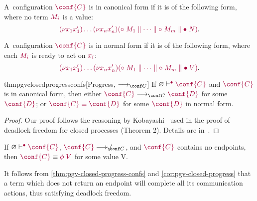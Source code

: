 \documentclass[main.tex]{subfiles}
\begin{document}
\begin{compacttheorems}
  \begin{definition}
    \label{def:pgv-canonical-forms}
    A~configuration $\tm{\conf{C}}$ is in canonical form if it is of the following form, where no term $\tm{M_i}$ is a value:
    \[
      \tm{\res{x_1}{x'_1}{\dots\res{x_n}{x'_n}{(\child\;M_1\parallel\dots\parallel\child\;M_m\parallel\main\;N)}}}.
    \]
  \end{definition}
  \begin{definition}
    A~configuration $\tm{\conf{C}}$ is in normal form if it is of the following form, where each $\tm{M_i}$ is ready to act on $\tm{x_i}$:
    \[
      \tm{\res{x_1}{x'_1}{\dots\res{x_n}{x'_n}{(\child\;M_1\parallel\dots\parallel\child\;M_m\parallel\main\;V)}}}.
    \]
  \end{definition}
  \begin{restatabletheorem}{thmpgvclosedprogressconfs}[Progress, $\cred$]
    \label{thm:pgv-closed-progress-confs}
    If $\cseq[\main]{\emptyenv}{\conf{C}}$ and $\tm{\conf{C}}$ is in canonical form, then either $\tm{\conf{C}}\cred\tm{\conf{D}}$ for some $\tm{\conf{D}}$; or $\tm{\conf{C}\equiv\conf{D}}$ for some $\tm{\conf{D}}$ in normal form.
  \end{restatabletheorem}
  \begin{proof}
    Our proof follows the reasoning by Kobayashi~\cite{kobayashi06} used in the proof of deadlock freedom for closed processes (Theorem 2). Details are in~.
  \end{proof}
  \begin{corollary}
    \label{cor:pgv-closed-progress}
    If $\cseq[\main]{\emptyenv}{\conf{C}}$, $\tm{\conf{C}}\centernot\cred$, and $\tm{\conf{C}}$ contains no endpoints, then $\tm{\conf{C}}\equiv\tm{\phi\;V}$ for some value V.
  \end{corollary}
\end{compacttheorems}
It follows from \cref{thm:pgv-closed-progress-confs} and \cref{cor:pgv-closed-progress} that a term which does not return an endpoint will complete all its communication actions, thus satisfying deadlock freedom.
\end{document}
